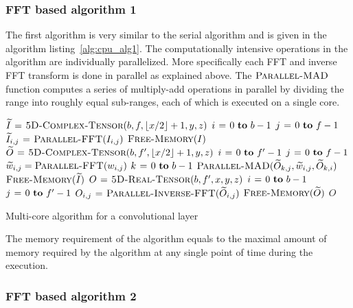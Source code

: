 \documentclass[conference]{IEEEtran}
\DeclarePairedDelimiter{\floor}{\lfloor}{\rfloor}
\begin{document}
\subsubsection{FFT based algorithm 1}

The first algorithm is very similar to the serial algorithm and is
given in the algorithm listing~\ref{alg:cpu_alg1}.  The computationally
intensive operations in the algorithm are individually parallelized.
More specifically each FFT and inverse FFT transform is done in
parallel as explained above.  The $\textnormal{\scshape Parallel-MAD}$ function
computes a series of multiply-add operations in parallel by dividing
the range into roughly equal sub-ranges, each of which is executed on
a single core.

\begin{algorithm}
  {\small
  \begin{codebox}
    \li $\widetilde{I} \gets \proc{5D-Complex-Tensor}(b,f,\floor{x/2}+1,y,z)$
    \li \For $i \gets 0 \To b-1$
    \li   \Do \For $j \gets 0 \To f-1$
    \li     \Do $\widetilde{I}_{i,j} \mathrel{\hspace{1pt}=\hspace{1pt}} \textnormal{\scshape Parallel-FFT}(I_{i,j})$
    \End \End
    \li $\textnormal{\scshape Free-Memory}(I)$
    \li $\widetilde{O} \gets \proc{5D-Complex-Tensor}(b,f',\floor{x/2}+1,y,z)$
    \li \For $i \gets 0 \To f'-1$
    \li   \Do \For $j \gets 0 \To f-1$
    \li     \Do $\widetilde{w}_{i,j} = \textnormal{\scshape Parallel-FFT}(w_{i,j})$
    \li         \For $k \gets 0 \To b-1$
    \li           \Do $\textnormal{\scshape Parallel-MAD}(\widetilde{O}_{k,j}, \widetilde{w}_{i,j}, \widetilde{O}_{k,i})$
    \End \End \End
    \li $\textnormal{\scshape Free-Memory}(\widetilde{I})$
    \li $O \mathrel{\hspace{1pt}=\hspace{1pt}} \textnormal{\scshape5D-Real-Tensor}(b,f',x,y,z)$
    \li \For $i \gets 0 \To b-1$
    \li   \Do \For $j \gets 0 \To f'-1$
    \li     \Do $O_{i,j} \mathrel{\hspace{1pt}=\hspace{1pt}} \textnormal{\scshape Parallel-Inverse-FFT}(\widetilde{O}_{i,j})$
    \End \End
    \li $\textnormal{\scshape Free-Memory}(\widetilde{O})$
    \li \Return $O$
  \end{codebox}
  }

  \caption{Multi-core algorithm for a convolutional
  layer}
  \label{alg:cpu_alg1}
\end{algorithm}

The memory requirement of the algorithm equals to the maximal amount
of memory required by the algorithm at any single point of time during
the execution.

\subsubsection{FFT based algorithm 2}
\end{document}
